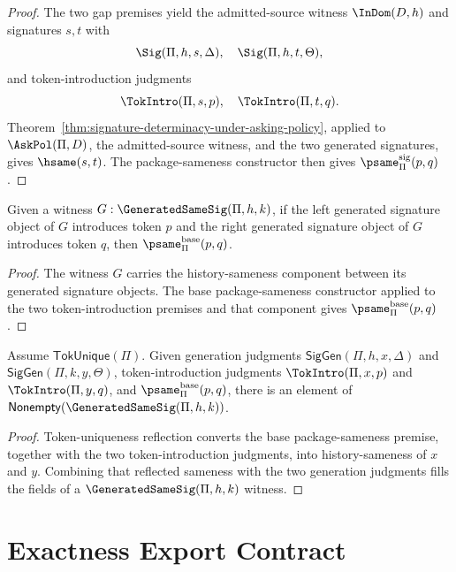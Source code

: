 \begin{proof}
The two gap premises yield the admitted-source witness $\InDom(D,h)$ and signatures $s,t$ with
$$
  \Sig(\Pi,h,s,\Delta),\quad
  \Sig(\Pi,h,t,\Theta),
$$
and token-introduction judgments
$$
  \TokIntro(\Pi,s,p),\quad
  \TokIntro(\Pi,t,q).
$$
Theorem~\ref{thm:signature-determinacy-under-asking-policy}, applied to $\AskPol(\Pi,D)$, the admitted-source witness, and the two generated signatures, gives $\hsame(s,t)$. The package-sameness constructor then gives $\psame_{\Pi}^{\mathrm{sig}}(p,q)$.
\end{proof}

\begin{theorem}
\label{thm:globalize-sound}
Given a witness $G:\GeneratedSameSig(\Pi,h,k)$, if the left generated signature object of $G$ introduces token $p$ and the right generated signature object of $G$ introduces token $q$, then $\psame_{\Pi}^{\mathrm{base}}(p,q)$.
\end{theorem}

\begin{proof}
The witness $G$ carries the history-sameness component between its generated signature objects. The base package-sameness constructor applied to the two token-introduction premises and that component gives $\psame_{\Pi}^{\mathrm{base}}(p,q)$.
\end{proof}

\begin{theorem}
\label{thm:globalize-complete}
Assume $\mathsf{TokUnique}(\Pi)$. Given generation judgments $\mathsf{SigGen}(\Pi,h,x,\Delta)$ and $\mathsf{SigGen}(\Pi,k,y,\Theta)$, token-introduction judgments $\TokIntro(\Pi,x,p)$ and $\TokIntro(\Pi,y,q)$, and $\psame_{\Pi}^{\mathrm{base}}(p,q)$, there is an element of $\mathsf{Nonempty}(\GeneratedSameSig(\Pi,h,k))$.
\end{theorem}

\begin{proof}
Token-uniqueness reflection converts the base package-sameness premise, together with the two token-introduction judgments, into history-sameness of $x$ and $y$. Combining that reflected sameness with the two generation judgments fills the fields of a $\GeneratedSameSig(\Pi,h,k)$ witness.
\end{proof}

\section{Exactness Export Contract}
\label{sec:po-exactness-export-contract-design}

